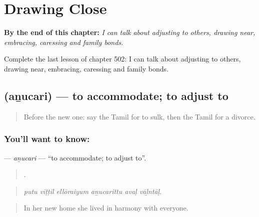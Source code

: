 
\chapter{Drawing Close}
\label{ch:ta-drawing-close}

\begin{chapteropening}
\textbf{By the end of this chapter:} \emph{I can talk about adjusting to others, drawing near, embracing, caressing and family bonds.}

Complete the last lesson of chapter 502: I can talk about adjusting to others, drawing near, embracing, caressing and family bonds.
\end{chapteropening}

\section[\texorpdfstring{\ta{அனுசரி} (aṉucari)}{அனுசரி (aṉucari)}]{ (aṉucari) — to accommodate; to adjust to}

\label{lesson:TA-C502-anucari}



\begin{quote}
Before the new one: say the Tamil for to sulk, then the Tamil for a divorce.
\end{quote}

\subsection*{You'll want to know: }
\textbf{} — \emph{aṉucari} — \textquotedblleft{}to accommodate; to adjust to\textquotedblright{}.

\begin{quote}
     .
\end{quote}

\begin{quote}
\emph{putu vīṭṭil ellōraiyum aṉucarittu avaḷ vāḻntāḷ.}
\end{quote}

\begin{quote}
In her new home she lived in harmony with everyone.
\end{quote}

